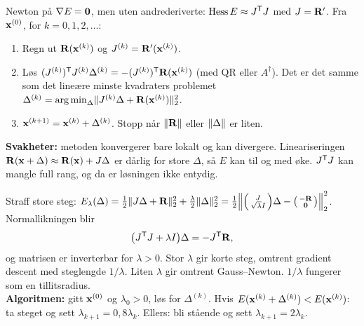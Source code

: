 \begin{oppskrift}
Newton på $\nabla E=\mathbf{0}$, men uten andrederiverte: $\operatorname{Hess} E\approx J^{\mathsf{T}} J$ med $J=\mathbf{R}'$. Fra $\mathbf{x}^{(0)}$, for $k=0,1,2,\dots$:
\begin{enumerate}
  \item Regn ut $\mathbf{R}(\mathbf{x}^{(k)})$ og $J^{(k)}=\mathbf{R}'(\mathbf{x}^{(k)})$.
  \item Løs $(J^{(k)})^{\mathsf{T}} J^{(k)}\Delta^{(k)}=-(J^{(k)})^{\mathsf{T}}\mathbf{R}(\mathbf{x}^{(k)})$ (med QR eller $A^\dagger$). Det er det samme som det lineære minste kvadraters problemet $\Delta^{(k)}=\operatorname*{arg\,min}_\Delta\lVert J^{(k)}\Delta+\mathbf{R}(\mathbf{x}^{(k)})\rVert_2^2$.
  \item $\mathbf{x}^{(k+1)}=\mathbf{x}^{(k)}+\Delta^{(k)}$. Stopp når $\lVert \mathbf{R}\rVert$ eller $\lVert \Delta\rVert$ er liten.
\end{enumerate}
\textbf{Svakheter:} metoden konvergerer bare lokalt og kan divergere. Lineariseringen $\mathbf{R}(\mathbf{x}+\Delta)\approx\mathbf{R}(\mathbf{x})+J\Delta$ er dårlig for store $\Delta$, så $E$ kan til og med øke. $J^{\mathsf{T}} J$ kan mangle full rang, og da er løsningen ikke entydig.
\end{oppskrift}
\begin{oppskrift}
Straff store steg: $E_\lambda(\Delta)=\frac12\lVert J\Delta+\mathbf{R}\rVert_2^2+\frac\lambda2\lVert \Delta\rVert_2^2=\frac12\Bigl\|\begin{psmallmatrix}J\\ \sqrt\lambda I\end{psmallmatrix}\Delta-\begin{psmallmatrix}-\mathbf{R}\\ \mathbf{0}\end{psmallmatrix}\Bigr\|_2^2$. Normallikningen blir
\[
\bigl(J^{\mathsf{T}} J+\lambda I\bigr)\Delta=-J^{\mathsf{T}}\mathbf{R},
\]
og matrisen er inverterbar for $\lambda>0$. Stor $\lambda$ gir korte steg, omtrent gradient descent med steglengde $1/\lambda$. Liten $\lambda$ gir omtrent Gauss--Newton. $1/\lambda$ fungerer som en tillitsradius.\\
\textbf{Algoritmen:} gitt $\mathbf{x}^{(0)}$ og $\lambda_0>0$, løs for $\Delta^{(k)}$. Hvis $E(\mathbf{x}^{(k)}+\Delta^{(k)})<E(\mathbf{x}^{(k)})$: ta steget og sett $\lambda_{k+1}=0{,}8\lambda_k$. Ellers: bli stående og sett $\lambda_{k+1}=2\lambda_k$.
\end{oppskrift}

